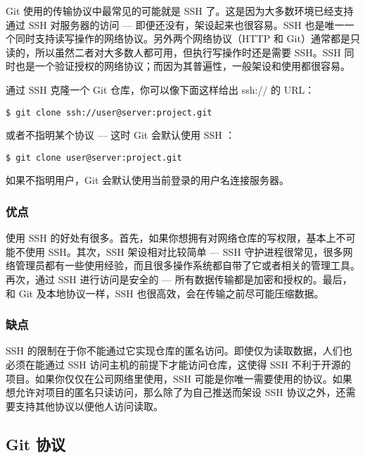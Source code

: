 \documentclass[a4paper]{book}
\begin{document}
Git 使用的传输协议中最常见的可能就是 SSH 了。这是因为大多数环境已经支持通过 SSH 对服务器的访问 --- 即便还没有，架设起来也很容易。SSH 也是唯一一个同时支持读写操作的网络协议。另外两个网络协议（HTTP 和 Git）通常都是只读的，所以虽然二者对大多数人都可用，但执行写操作时还是需要 SSH。SSH 同时也是一个验证授权的网络协议；而因为其普遍性，一般架设和使用都很容易。

通过 SSH 克隆一个 Git 仓库，你可以像下面这样给出 ssh:// 的 URL：

\begin{shaded}\begin{verbatim}
$ git clone ssh://user@server:project.git
\end{verbatim}\end{shaded}

或者不指明某个协议 --- 这时 Git 会默认使用 SSH ：

\begin{shaded}\begin{verbatim}
$ git clone user@server:project.git
\end{verbatim}\end{shaded}

如果不指明用户，Git 会默认使用当前登录的用户名连接服务器。

\subsubsection{优点}

使用 SSH 的好处有很多。首先，如果你想拥有对网络仓库的写权限，基本上不可能不使用 SSH。其次，SSH 架设相对比较简单 --- SSH 守护进程很常见，很多网络管理员都有一些使用经验，而且很多操作系统都自带了它或者相关的管理工具。再次，通过 SSH 进行访问是安全的 --- 所有数据传输都是加密和授权的。最后，和 Git 及本地协议一样，SSH 也很高效，会在传输之前尽可能压缩数据。

\subsubsection{缺点}

SSH 的限制在于你不能通过它实现仓库的匿名访问。即使仅为读取数据，人们也必须在能通过 SSH 访问主机的前提下才能访问仓库，这使得 SSH 不利于开源的项目。如果你仅仅在公司网络里使用，SSH 可能是你唯一需要使用的协议。如果想允许对项目的匿名只读访问，那么除了为自己推送而架设 SSH 协议之外，还需要支持其他协议以便他人访问读取。

\subsection{Git 协议}
\end{document}
